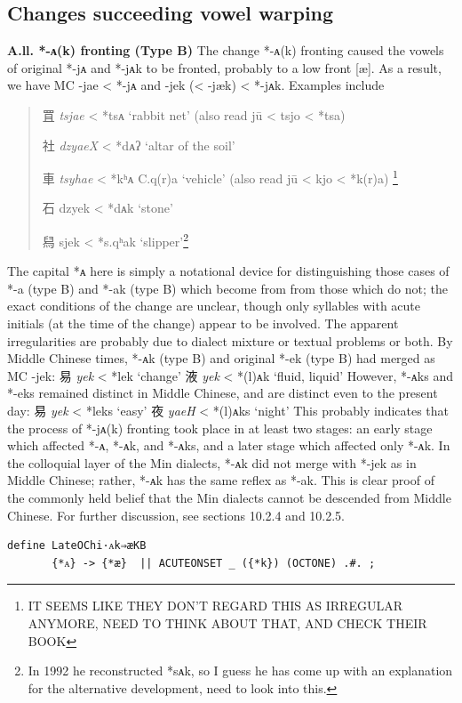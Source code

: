 \documentclass[xetex, svgnames, 12pt]{scrartcl}
\newcounter{para}
\newcommand\mypara[1]{\par\refstepcounter{para}\textbf{\thepara\space#1\space}}
\begin{document}
\subsection{Changes succeeding vowel warping}

\mypara{A.ll. *-ᴀ(k) fronting (Type B)}
 The change *-ᴀ(k) fronting caused the vowels of original *-jᴀ and *-jᴀk to be fronted,
 probably to a low front [æ]. As a result, we have MC -jae < *-jᴀ and -jek (< -jæk) < *-jᴀk.
 Examples include
 \begin{quote}
 罝 %
 \textit{tsjae} < *tsᴀ `rabbit net' (also read jū < tsjo < *tsa)
 
 社 %
 \textit{dzyaeX} < *dᴀʔ `altar of the soil'
 
 車 %
 \textit{tsyhae} < *kʰᴀ C.q(r)a `vehicle' (also read jū < kjo < *k(r)a) \footnote{IT SEEMS LIKE THEY DON'T REGARD THIS AS IRREGULAR ANYMORE, NEED TO THINK ABOUT THAT, AND CHECK THEIR BOOK}
 
 石 %
 dzyek < *dᴀk `stone'
 
 舄 %
 sjek < *s.qʰak `slipper'\footnote{In 1992 he reconstructed *sᴀk, so I guess he has come up with an explanation for the alternative development, need to look into this.}
 \end{quote}
 The capital *ᴀ here is simply a notational device for distinguishing those cases of *-a (type B) 
 and *-ak (type B) which become from from those which do not; 
 the exact conditions of the change are
 unclear, though only syllables with acute initials (at the time of the change) appear to be
 involved. The apparent irregularities are probably due to dialect mixture or textual problems
 or both. By Middle Chinese times, *-ᴀk (type B) and original *-ek (type B) had merged as MC -jek:
 易 %
 \textit{yek} < *lek `change'
 液 %
 \textit{yek} < *(l)ᴀk `fluid, liquid'
 However, *-ᴀks and *-eks remained distinct in Middle Chinese, and are distinct even to
 the present day:
 易 %
 \textit{yek} < *leks `easy'
 夜 %
 \textit{yaeH} < *(l)ᴀks `night'
 This probably indicates that the process of *-jᴀ(k) fronting took place in at least two
 stages: an early stage which affected *-ᴀ, *-ᴀk, and *-ᴀks, and a later stage which
 affected only *-ᴀk.
 In the colloquial layer of the Min dialects, *-ᴀk did not merge with *-jek as in Middle
 Chinese; rather, *-ᴀk has the same reflex as *-ak. This is clear proof of the commonly held
 belief that the Min dialects cannot be descended from Middle Chinese. For further
 discussion, see sections 10.2.4 and 10.2.5.
\begin{verbatim}
define LateOChi·ᴀk⇒æKB 
       {*ᴀ} -> {*æ}  || ACUTEONSET _ ({*k}) (OCTONE) .#. ; 
\end{verbatim} 
\end{document}
